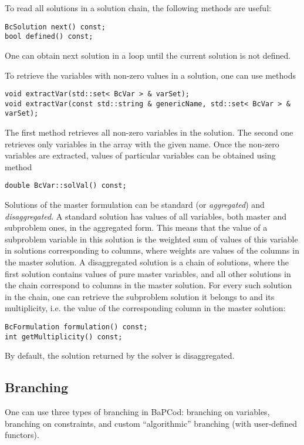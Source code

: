 \documentclass[10pt,a4paper]{article}
\newcommand{\bc}{BaPCod\xspace}
\begin{document}
To read all solutions in a solution chain, the following methods are useful:
\begin{lstlisting}
BcSolution next() const;
bool defined() const;
\end{lstlisting}
One can obtain next solution in a loop until the current solution is not defined.

To retrieve the variables with non-zero values in a solution, one can use methods
\begin{lstlisting}
void extractVar(std::set< BcVar > & varSet);
void extractVar(const std::string & genericName, std::set< BcVar > & varSet);
\end{lstlisting}
The first method retrieves all non-zero variables in the solution. The second one retrieves only variables in the array
with the given name. Once the non-zero variables are extracted, values of particular variables can be obtained using
method
\begin{lstlisting}
double BcVar::solVal() const;
\end{lstlisting}

Solutions of the master formulation can be standard (or \emph{aggregated}) and \emph{disaggregated}. A standard solution
has values of all variables, both master and subproblem ones, in the aggregated form. This means that the value of a
subproblem variable in this solution is the weighted sum of values of this variable in solutions corresponding to
columns, where weights are values of the columns in the master solution. A disaggregated solution is a chain of
solutions, where the first solution contains values of pure master variables, and all other solutions in the chain
correspond to columns in the master solution. For every such solution in the chain, one can retrieve the subproblem
solution it belongs to and its multiplicity, i.e. the value of the corresponding column in the master solution:
\begin{lstlisting}
BcFormulation formulation() const;
int getMultiplicity() const;
\end{lstlisting}
By default, the solution returned by the solver is disaggregated.

\subsection{Branching}
\label{sec:branching}

One can use three types of branching in \bc: branching on variables, branching on constraints, and custom
``algorithmic'' branching (with user-defined functors). 
\end{document}
